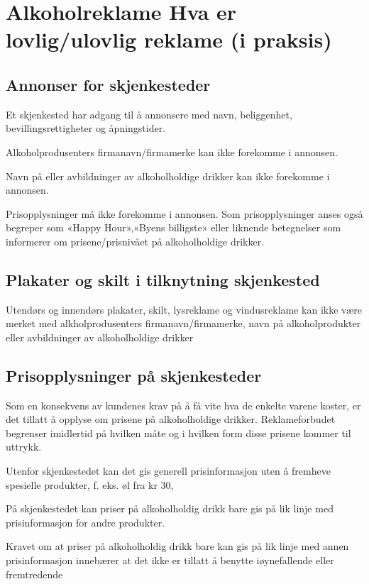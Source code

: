 \chapter{Alkoholreklame \textendash{} Hva er lovlig/ulovlig reklame (i praksis)}
\section{Annonser for skjenkesteder}

Et skjenkested har adgang til å annonsere med navn, beliggenhet, bevillingsrettigheter og åpningstider.

Alkoholprodusenters firmanavn/firmamerke kan ikke forekomme i annonsen.

Navn på eller avbildninger av alkoholholdige drikker kan ikke forekomme i annonsen.

Prisopplysninger må ikke forekomme i annonsen. Som prisopplysninger anses også begreper som «Happy Hour»,«Byens billigste» eller liknende betegnelser som informerer om prisene/prisnivået på alkoholholdige drikker.

\section{Plakater og skilt i tilknytning skjenkested}

Utendørs og innendørs plakater, skilt, lysreklame og vindusreklame kan ikke være merket med alkholprodusenters firmanavn/firmamerke, navn på alkoholprodukter eller avbildninger av alkoholholdige drikker

\section{Prisopplysninger på skjenkesteder}

Som en konsekvens av kundenes krav på å få vite hva de enkelte varene koster, er det tillatt å opplyse om prisene på alkoholholdige drikker. Reklameforbudet begrenser imidlertid på hvilken måte og i hvilken form disse prisene kommer til uttrykk.

Utenfor skjenkestedet kan det gis generell prisinformasjon uten å fremheve spesielle produkter, f. eks. øl fra kr 30,\textendash

På skjenkestedet kan priser på alkoholholdig drikk bare gis på lik linje med prisinformasjon for andre produkter.

Kravet om at priser på alkoholholdig drikk bare kan gis på lik linje med annen prisinformasjon innebærer at det ikke er tillatt å benytte iøynefallende eller fremtredende

